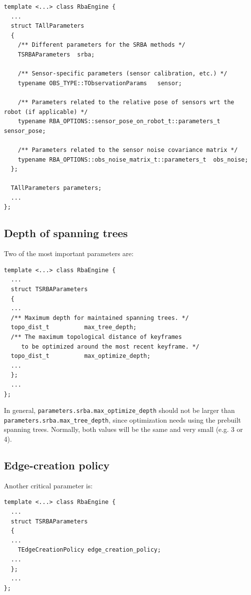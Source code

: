 \documentclass[a4paper,11pt]{article}
\begin{document}
\begin{lstlisting}
template <...> class RbaEngine {
  ...
  struct TAllParameters
  {
    /** Different parameters for the SRBA methods */
    TSRBAParameters  srba;

    /** Sensor-specific parameters (sensor calibration, etc.) */
    typename OBS_TYPE::TObservationParams   sensor;

    /** Parameters related to the relative pose of sensors wrt the robot (if applicable) */
    typename RBA_OPTIONS::sensor_pose_on_robot_t::parameters_t  sensor_pose;

    /** Parameters related to the sensor noise covariance matrix */
    typename RBA_OPTIONS::obs_noise_matrix_t::parameters_t  obs_noise;
  };

  TAllParameters parameters;
  ...
};
\end{lstlisting}

  
\subsection{Depth of spanning trees}

Two of the most important parameters are:

\begin{lstlisting}
template <...> class RbaEngine {
  ...
  struct TSRBAParameters
  {
  ...
  /** Maximum depth for maintained spanning trees. */
  topo_dist_t          max_tree_depth;
  /** The maximum topological distance of keyframes 
     to be optimized around the most recent keyframe. */
  topo_dist_t          max_optimize_depth;
  ...
  };
  ...
};
\end{lstlisting}

In general, \texttt{parameters.srba.max\_optimize\_depth} should not be larger than 
\texttt{parameters.srba.max\_tree\_depth}, 
since optimization needs using the prebuilt spanning trees. Normally, both values will be the same and very small (e.g. 3 or 4).

\subsection{Edge-creation policy}
\label{sect:edge.policy}

Another critical parameter is:

\begin{lstlisting}
template <...> class RbaEngine {
  ...
  struct TSRBAParameters
  {
  ...
    TEdgeCreationPolicy edge_creation_policy;
  ...
  };
  ...
};
\end{lstlisting}
\end{document}
